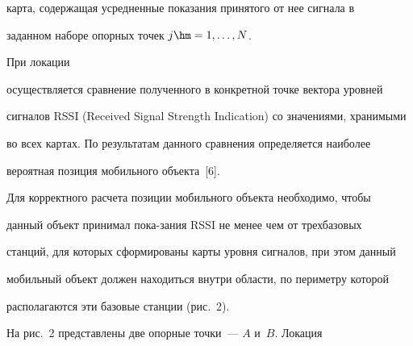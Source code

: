 карта, содержащая усредненные показания принятого от нее сигнала в

заданном наборе опорных точек $j\hm= 1,\ldots , N$. 



При локации

осуществляется сравнение полученного в конкретной точке вектора уровней

сигналов RSSI (Received Signal Strength Indication) со значениями, хранимыми

во всех картах. По результатам данного сравнения определяется наиболее

вероятная позиция мобильного объекта~[6].








 Для корректного расчета позиции мобильного объекта необходимо, чтобы

данный объект принимал пока-\linebreak зания RSSI не менее чем от трех\linebreak базовых

станций, для которых сформированы карты уровня сигналов, при этом данный

мобильный объект должен находиться внутри области, по периметру которой

располагаются эти базовые станции (рис.~2).



 На рис.~2 представлены две опорные точки~--- $A$ и~$B$. Локация

